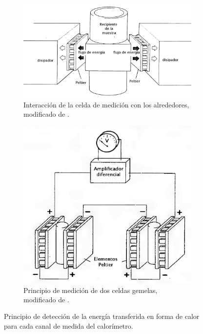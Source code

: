 	\begin{figure}[h]
		\centering
		\begin{subfigure}{0.59\linewidth}
			\includegraphics[width=\linewidth]{Figures/heatFlow}
			\caption{Interacci\'on de la celda de medici\'on con los alrededores, modificado de \cite{Suurkuusk}.}
			\label{fig: heatFlow}
		\end{subfigure}
		\begin{subfigure}{0.39\linewidth}
			\includegraphics[width=\linewidth]{Figures/twinMeasuring}
			\caption{Principio de medici\'on de dos celdas gemelas, modificado de \cite{Suurkuusk}.}
			\label{fig: twin}
		\end{subfigure}
		\caption{Principio de detecci\'on de la energ\'ia transferida en forma de calor para cada canal de medida del calor\'imetro.}
	\end{figure}
	\newpage

